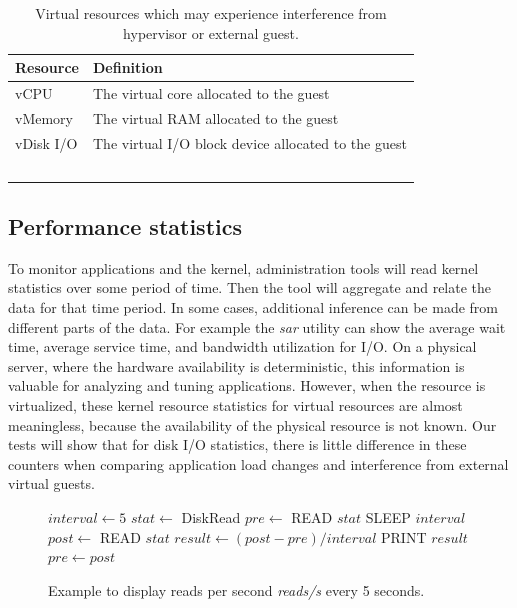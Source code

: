 \begin{table}[h]
  \begin{tabular}{ l p{10cm} }
    Resource & Definition \\
    \hline
    vCPU & The virtual core allocated to the guest \\
    vMemory & The virtual RAM allocated to the guest \\
    vDisk I/O & The virtual I/O block device allocated to the guest \\
    \hline
  \end{tabular}
\caption{Virtual resources which may experience interference from hypervisor or external guest.}
\label{tab:resources}
\end{table}

\subsection{Performance statistics}
To monitor applications and the kernel, administration tools will read kernel statistics over some period of time.  Then the tool will aggregate and relate the data for that time period.  In some cases, additional inference can be made from different parts of the data.  For example the \emph{sar} utility can show the average wait time, average service time, and bandwidth utilization for I/O.  On a physical server, where the hardware availability is deterministic, this information is valuable for analyzing and tuning applications.  However, when the resource is virtualized, these kernel resource statistics for virtual resources are almost meaningless, because the availability of the physical resource is not known.  Our tests will show that for disk I/O statistics, there is little difference in these counters when comparing application load changes and interference from external virtual guests. 

\begin{figure}[h]
\begin{algorithmic}[H]
 \STATE $interval \gets 5$
 \STATE $stat \gets$  DiskRead       
 \STATE $pre \gets $ READ $stat$ 
 \LOOP
    \STATE SLEEP $interval$
    \STATE $post \gets$ READ $stat$
    \STATE $result \gets (post - pre)/interval$
    \STATE PRINT  $result$
    \STATE $pre \gets post$ 
 \ENDLOOP
\end{algorithmic}
\caption{Example to display reads per second \emph{reads/s} every 5 seconds.}
\label{alg1}
\end{figure}

